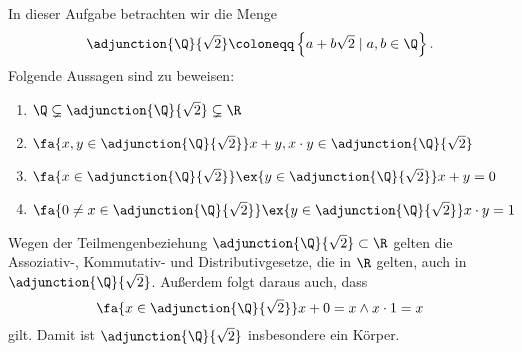 \begin{exercise}
  In dieser Aufgabe betrachten wir die Menge
  \[
    \adjunction{\Q}{\sqrt 2}
    \coloneqq
    \left\{ a + b \sqrt{2} \mid  a,b \in \Q \right\}.
  \]
  Folgende Aussagen sind zu beweisen:
  \begin{enumerate}
  \item \( \Q \subsetneq \adjunction{\Q}{\sqrt 2} \subsetneq \R\)
  \item
    \( \fa{x,y \in \adjunction{\Q}{\sqrt 2}} x + y, x \cdot y \in
    \adjunction{\Q}{\sqrt 2}\)
  \item
    \( \fa{x \in \adjunction{\Q}{\sqrt{2}}} \ex{y \in \adjunction{\Q}{\sqrt{2}}}
      x + y = 0\)
    \item
      \( \fa{0 \neq x \in \adjunction{\Q}{\sqrt{2}}} \ex{y \in
        \adjunction{\Q}{\sqrt{2}}} x \cdot y = 1\)
  \end{enumerate}
  Wegen der Teilmengenbeziehung \(\adjunction{\Q}{\sqrt 2} \subset \R\) gelten
  die Assoziativ-, Kommutativ- und Distributivgesetze, die in \(\R\) gelten, auch
  in \(\adjunction{\Q}{\sqrt 2}\). Außerdem folgt daraus auch, dass
  \[
    \fa{x \in \adjunction{\Q}{\sqrt{2}}} x + 0 = x \land x \cdot 1 = x
  \]
  gilt. Damit ist \(\adjunction{\Q}{\sqrt{2}}\) insbesondere ein Körper.
\end{exercise}
